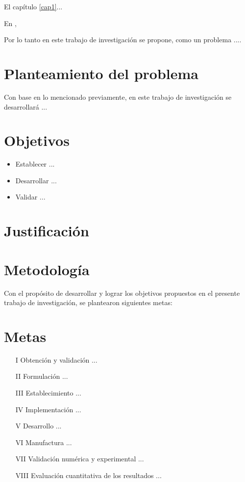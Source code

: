 El capítulo \ref{cap1}...

En \cite{RolandSiegwart+IllanNourbakhsh},


Por lo tanto en este trabajo de investigación se propone, como un problema ....

\section{Planteamiento del problema}
Con base en lo mencionado previamente, en este trabajo de investigación se desarrollará ...


\section{Objetivos}
\begin{itemize}
  \item Establecer ...
  \item Desarrollar ...
  \item Validar ...
\end{itemize}

\section{Justificación}



\section{Metodología}
Con el propósito de desarrollar y lograr los objetivos propuestos en el presente trabajo de investigación, se plantearon siguientes metas:
\section*{Metas}
\begin{itemize}
  \item[I] Obtención y validación ...
  \item[II] Formulación ...
  \item[III] Establecimiento ...
  \item[IV] Implementación ...
  \item[V] Desarrollo ...
  \item[VI] Manufactura ...
  \item[VII] Validación numérica y experimental ...
  \item[VIII] Evaluación cuantitativa de los resultados ...
\end{itemize}





